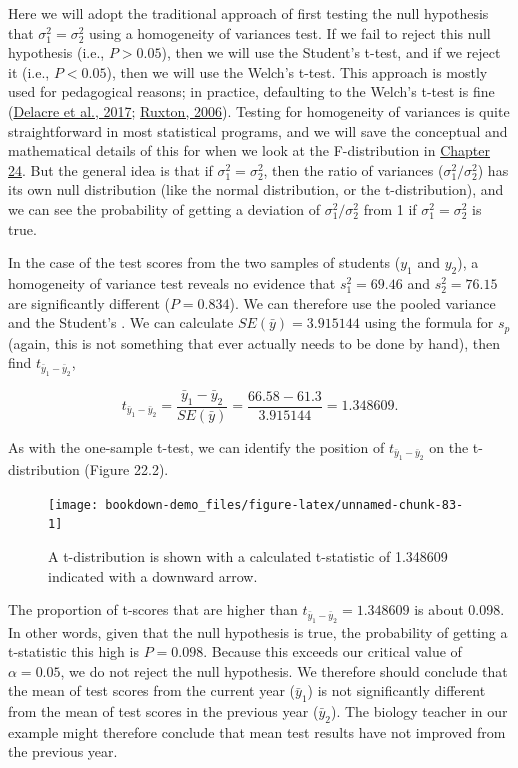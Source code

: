 \documentclass[
  openany]{krantz}
\begin{document}
Here we will adopt the traditional approach of first testing the null hypothesis that \(\sigma^{2}_{1} = \sigma^{2}_{2}\) using a homogeneity of variances test.
If we fail to reject this null hypothesis (i.e., \(P > 0.05\)), then we will use the Student's t-test, and if we reject it (i.e., \(P < 0.05\)), then we will use the Welch's t-test.
This approach is mostly used for pedagogical reasons; in practice, defaulting to the Welch's t-test is fine (\protect\hyperlink{ref-Delacre2017}{Delacre et al., 2017}; \protect\hyperlink{ref-Ruxton2006}{Ruxton, 2006}).
Testing for homogeneity of variances is quite straightforward in most statistical programs, and we will save the conceptual and mathematical details of this for when we look at the F-distribution in \protect\hyperlink{Chapter_24}{Chapter 24}.
But the general idea is that if \(\sigma^{2}_{1} = \sigma^{2}_{2}\), then the ratio of variances (\(\sigma^{2}_{1}/\sigma^{2}_{2}\)) has its own null distribution (like the normal distribution, or the t-distribution), and we can see the probability of getting a deviation of \(\sigma^{2}_{1}/\sigma^{2}_{2}\) from 1 if \(\sigma^{2}_{1} = \sigma^{2}_{2}\) is true.

In the case of the test scores from the two samples of students (\(y_{1}\) and \(y_{2}\)), a homogeneity of variance test reveals no evidence that \(s^{2}_{1} = 69.46\) and \(s^{2}_{2} = 76.15\) are significantly different (\(P = 0.834\)).
We can therefore use the pooled variance and the Student's .
We can calculate \(SE(\bar{y}) = 3.915144\) using the formula for \(s_{p}\) (again, this is not something that ever actually needs to be done by hand), then find \(t_{\bar{y}_{1} - \bar{y}_{2}}\),

\[t_{\bar{y}_{1} - \bar{y}_{2}} = \frac{\bar{y}_{1} - \bar{y}_{2}}{SE(\bar{y})} = \frac{66.58 - 61.3}{3.915144} = 1.348609.\]

As with the one-sample t-test, we can identify the position of \(t_{\bar{y}_{1} - \bar{y}_{2}}\) on the t-distribution (Figure 22.2).

\begin{figure}
\texttt{[image: bookdown-demo\_files/figure-latex/unnamed-chunk-83-1]} \caption{A t-distribution is shown with a calculated t-statistic of 1.348609 indicated with a downward arrow.}\label{fig:unnamed-chunk-83}
\end{figure}

The proportion of t-scores that are higher than \(t_{\bar{y}_{1} - \bar{y}_{2}} = 1.348609\) is about 0.098.
In other words, given that the null hypothesis is true, the probability of getting a t-statistic this high is \(P = 0.098\).
Because this  exceeds our critical value of \(\alpha = 0.05\), we do not reject the null hypothesis.
We therefore should conclude that the mean of test scores from the current year (\(\bar{y}_{1}\)) is not significantly different from the mean of test scores in the previous year (\(\bar{y}_{2}\)).
The biology teacher in our example might therefore conclude that mean test results have not improved from the previous year.
\end{document}

